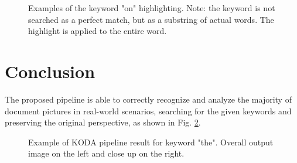 \documentclass[a4paper]{article}
\begin{document}
\begin{figure}[H]
	\caption{ Examples of the keyword "on" highlighting. Note: the keyword is not searched as a perfect match, but as a substring of actual words. The highlight is applied to the entire word.}
	\label{fig:keywordhighliting2}
\end{figure}

\section{Conclusion}

The proposed pipeline is able to correctly recognize and analyze the majority of document pictures in real-world scenarios, searching for the given keywords and preserving the original perspective, as shown in Fig. \ref{fig:result}.

\begin{figure}[H]
	\caption{Example of KODA pipeline result for keyword "the". Overall output image on the left and close up on the right.}
	\label{fig:result}
\end{figure}
\end{document}
